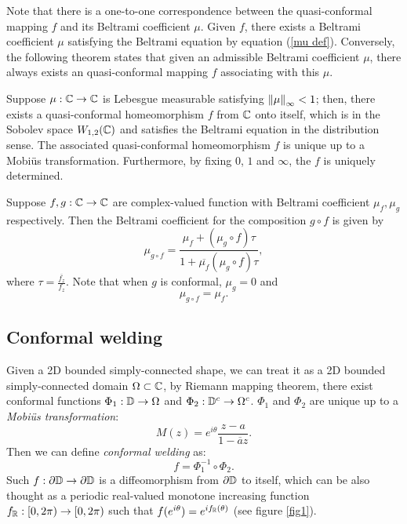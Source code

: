 \documentclass[review,onefignum,onetabnum]{siamonline190516}
\begin{document}
        
        Note that there is a one-to-one correspondence between the quasi-conformal mapping $f$ and its Beltrami coefficient $\mu$. Given $f$, there exists a Beltrami coefficient $\mu$ satisfying the Beltrami equation by equation (\ref{mu def}). Conversely, the following theorem states that given an admissible Beltrami coefficient $\mu$, there always exists an quasi-conformal mapping $f$ associating with this $\mu$.

        \begin{theorem}\label{Measurable Riemannian Mapping Theorem}
            Suppose $\mu : \mathbb{C} \rightarrow \mathbb{C}$ is Lebesgue measurable satisfying $\left\Vert \mu \right\Vert_\infty <1$; then, there exists a quasi-conformal homeomorphism $f$ from $\mathbb{C}$ onto itself, which is in the Sobolev space $W_{1,2}(\mathbb{C})$ and satisfies the Beltrami equation in the distribution sense. The associated quasi-conformal homeomorphism $f$ is unique up to a Mobi\"us transformation. Furthermore, by fixing $0$, $1$ and $\infty$, the $f$ is uniquely determined.
        \end{theorem}

        Suppose $f, g: \mathbb{C} \rightarrow \mathbb{C}$ are complex-valued function with Beltrami coefficient $\mu_f, \mu_g$ respectively. Then the Beltrami coefficient for the composition $g \circ f$ is given by 
        \begin{equation}\label{mu of composition}
            \mu_{g \circ f} = \frac{\mu_f+(\mu_g \circ f) \tau}{1+\overline{\mu_f}(\mu_g \circ f) \tau},
        \end{equation}
        where $\tau = \frac{\overline{f_z}}{f_z}$. Note that when $g$ is conformal, $\mu_g = 0$ and 
        \begin{equation}\label{mu of conformal composition}
            \mu_{g \circ f} = \mu_f.
        \end{equation}

    \subsection{Conformal welding}\label{welding}
        Given a 2D bounded simply-connected shape, we can treat it as a 2D bounded simply-connected domain $\Omega \subset \mathbb{C}$, by Riemann mapping theorem, there exist conformal functions $\Phi_1: \mathbb{D} \rightarrow \Omega$ and $\Phi_2: \mathbb{D}^c \rightarrow \Omega^c$. $\Phi_1$ and $\Phi_2$ are unique up to a \textit{Mobi\"us transformation}:
        \begin{equation}
            M(z) = e^{i \theta} \frac{z - a}{1 - \overline{a}z}.
        \end{equation}
        Then we can define \textit{conformal welding} as:
        \begin{equation}
            f = \Phi_1^{-1} \circ \Phi_2.
        \end{equation}
        Such $f: \partial \mathbb{D} \rightarrow \partial \mathbb{D}$ is a diffeomorphism from $\partial \mathbb{D}$ to itself, which can be also thought as a periodic real-valued monotone increasing function $f_{\mathbb{R}}: [0, 2\pi) \rightarrow [0, 2\pi)$ such that $f(e^{i \theta}) = e^{i f_{\mathbb{R}}(\theta)}$ (see figure \ref{fig1}).
        
\end{document}
